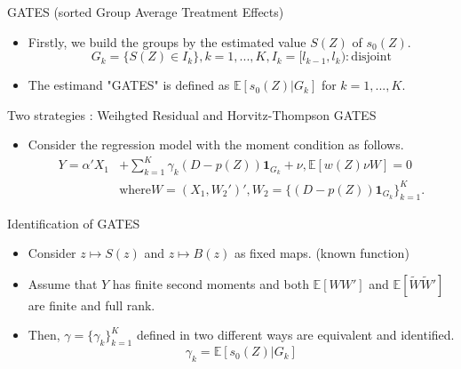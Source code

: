 \documentclass[xcolor=svgnames,aspectratio=169]{beamer}
\newcommand{\E}{\mathbb{E}}
\begin{document}
\begin{frame}{GATES (sorted Group Average Treatment Effects)}
    \begin{itemize}
        \item Firstly, we build the groups by the estimated value $S(Z)$ of $s_0(Z)$.
        \[
        G_k=\{S(Z)\in I_k\}, k=1,...,K, I_k=[l_{k-1},l_k) : \text{disjoint}
        \]
        \item The estimand "GATES" is defined as $\E[s_0(Z)|G_k]$ for $k=1,...,K$.
        
    \end{itemize}
\end{frame}

\begin{frame}{Two strategies : Weihgted Residual and Horvitz-Thompson GATES}
    \begin{itemize}
        \item Consider the regression model with the moment condition as follows.
        \begin{align*}
            Y=\alpha'X_1&+\sum_{k=1}^{K}\gamma_k(D-p(Z))\mathbf{1}_{G_k}+\nu, \E[w(Z)\nu W]=0 \\
            &\text{where} W=(X_1, W_2')', W_2=\{(D-p(Z))\mathbf{1}_{G_k}\}_{k=1}^K.
        \end{align*}
    \end{itemize}
\end{frame}

\begin{frame}{Identification of GATES}
    \begin{itemize}
        \begin{tcolorbox}[colframe=Cyan,title=Theorem 3]
        \begin{itemize}
            \item Consider $z\mapsto S(z)$ and $z\mapsto B(z)$ as fixed maps. (known function)
            \item Assume that $Y$ has finite second moments and  both $\E[WW']$ and $\E[\tilde{W}\tilde{W}']$ are finite and full rank.
            \item Then, $\gamma=\{\gamma_k\}_{k=1}^K$ defined in two different ways are equivalent and identified.
            \[
            \gamma_k=\E[s_0(Z)|G_k]
            \]
        \end{itemize}
    \end{tcolorbox}
    \end{itemize}
\end{frame}
\end{document}
